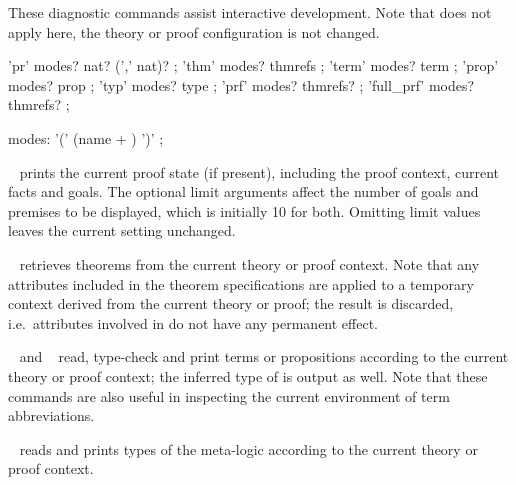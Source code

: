 \begin{isabellebody}
\begin{isamarkuptext}
  These diagnostic commands assist interactive development.  Note that
  \hyperlink{command.undo}{\mbox{}} does not apply here, the theory or proof
  configuration is not changed.

  \begin{rail}
    'pr' modes? nat? (',' nat)?
    ;
    'thm' modes? thmrefs
    ;
    'term' modes? term
    ;
    'prop' modes? prop
    ;
    'typ' modes? type
    ;
    'prf' modes? thmrefs?
    ;
    'full\_prf' modes? thmrefs?
    ;

    modes: '(' (name + ) ')'
    ;
  \end{rail}

  \begin{descr}

  \item [\hyperlink{command.pr}{\mbox{\isa{\isacommand{pr}}}}~\isa{{\isachardoublequote}goals{\isacharcomma}\ prems{\isachardoublequote}}] prints the current
  proof state (if present), including the proof context, current facts
  and goals.  The optional limit arguments affect the number of goals
  and premises to be displayed, which is initially 10 for both.
  Omitting limit values leaves the current setting unchanged.

  \item [\hyperlink{command.thm}{\mbox{\isa{\isacommand{thm}}}}~\isa{{\isachardoublequote}a\isactrlsub {\isadigit{1}}\ {\isasymdots}\ a\isactrlsub n{\isachardoublequote}}] retrieves
  theorems from the current theory or proof context.  Note that any
  attributes included in the theorem specifications are applied to a
  temporary context derived from the current theory or proof; the
  result is discarded, i.e.\ attributes involved in  do not have any permanent effect.

  \item [\hyperlink{command.term}{\mbox{\isa{\isacommand{term}}}}~\isa{t} and \hyperlink{command.prop}{\mbox{\isa{\isacommand{prop}}}}~\isa{{\isasymphi}}]
  read, type-check and print terms or propositions according to the
  current theory or proof context; the inferred type of  is
  output as well.  Note that these commands are also useful in
  inspecting the current environment of term abbreviations.

  \item [\hyperlink{command.typ}{\mbox{\isa{\isacommand{typ}}}}~\isa{{\isasymtau}}] reads and prints types of the
  meta-logic according to the current theory or proof context.


\end{descr}
\end{isamarkuptext}
\end{isabellebody}
